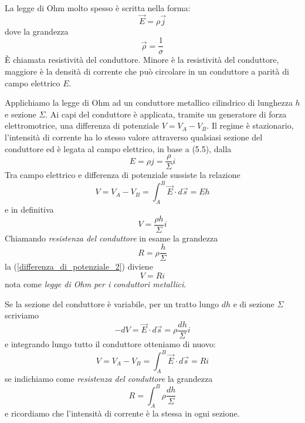\documentclass[class=book, crop=false, oneside, 12pt]{standalone}
\begin{document}
La legge di Ohm molto spesso è scritta nella forma:
\begin{equation}
    \overrightarrow{E} = \rho \overrightarrow{j}
\end{equation} 
dove la grandezza
\begin{equation}
    \overrightarrow{\rho} = \frac{1}{\sigma}
\end{equation}
È chiamata resistività del conduttore. 
Minore è la resistività del conduttore, maggiore è la densità di corrente che può circolare in un conduttore a parità di campo elettrico \(E\).

Applichiamo la legge di Ohm ad un conduttore metallico cilindrico di lunghezza \(h\) e sezione \(\Sigma\). 
Ai capi del conduttore è applicata, tramite un generatore di forza elettromotrice, una differenza di potenziale \(V = V_A - V_B\).
Il regime è stazionario, l'intensità di corrente ha lo stesso valore attraverso qualsiasi sezione del conduttore ed è legata al campo elettrico, in base a (5.5), dalla
\begin{equation*}
    E = \rho j = \frac{\rho}{\Sigma} i
\end{equation*}
Tra campo elettrico e differenza di potenziale sussiste la relazione 
\begin{equation*} 
    V = V_A - V_B = \int_A^B \overrightarrow{E} \cdot d \overrightarrow{s} = E h
\end{equation*}
e in definitiva 
\begin{equation}
    V = \frac{\rho h}{\Sigma} i
\end{equation} \label{differenza_di_potenziale_2}
Chiamando \emph{resistenza del conduttore} in esame la grandezza
\begin{equation}
    R = \rho \frac{h}{\Sigma}
\end{equation}
la (\ref{differenza_di_potenziale_2}) diviene
\begin{equation} \label{legge_di_ohm_2}
    V = R i
\end{equation}
nota come \emph{legge di Ohm per i conduttori metallici}.

Se la sezione del conduttore è variabile, per un tratto lungo \(dh\) e di sezione \(\Sigma\) scriviamo 
\begin{equation*}
    -d V = \overrightarrow{E} \cdot d \overrightarrow{s} = \rho \frac{dh}{\Sigma} i 
\end{equation*}
e integrando lungo tutto il conduttore otteniamo di nuovo:
\begin{equation*}
    V = V_A - V_B = \int_A^B \overrightarrow{E} \cdot d \overrightarrow{s} = R i
\end{equation*}
se indichiamo come \emph{resistenza del conduttore} la grandezza
\begin{equation}
    R = \int_A^B \rho \frac{dh }{\Sigma}
\end{equation}
e ricordiamo che l'intensità di corrente è la stessa in ogni sezione. 
\end{document}
